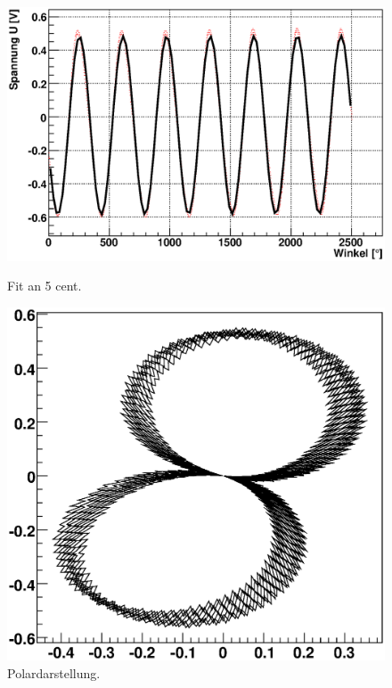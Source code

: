\documentclass[12pt]{article}
\begin{document}
\begin{figure}[H]  
\begin{minipage}{0.49\linewidth}
\centering
\includegraphics[width=0.9\linewidth]{pictures/5cent.eps}
\caption{Fit an 5 cent.}
\end{minipage}
\begin{minipage}{0.5\linewidth}
\centering 
\includegraphics[width=0.9\linewidth]{pictures/5centvd.eps}
\caption{Polardarstellung.}
\end{minipage}
\end{figure}
\end{document}
